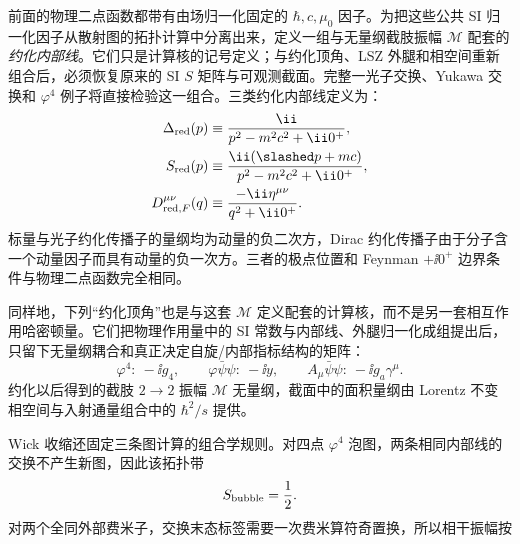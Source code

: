 前面的物理二点函数都带有由场归一化固定的 $\hbar,c,\mu_0$ 因子。为把这些公共 SI 归一化因子从散射图的拓扑计算中分离出来，定义一组与无量纲截肢振幅 $\mathcal M$ 配套的\emph{约化内部线}。它们只是计算核的记号定义；与约化顶角、LSZ 外腿和相空间重新组合后，必须恢复原来的 SI $S$ 矩阵与可观测截面。完整一光子交换、Yukawa 交换和 $\varphi^4$ 例子将直接检验这一组合。三类约化内部线定义为：
\begin{align}
 \Delta_{\rm red}(p)
 &\equiv\frac{\ii}{p^2-m^2c^2+\ii0^+},\\
 S_{\rm red}(p)
 &\equiv\frac{\ii(\slashed p+mc)}
 {p^2-m^2c^2+\ii0^+},
 \\
 D_{{\rm red},F}^{\mu\nu}(q)
 &\equiv\frac{-\ii\eta^{\mu\nu}}
 {q^2+\ii0^+}.
 \label{eq:si-reduced-propagators-r10}
\end{align}
标量与光子约化传播子的量纲均为动量的负二次方，Dirac 约化传播子由于分子含一个动量因子而具有动量的负一次方。三者的极点位置和 Feynman $+\ii0^+$ 边界条件与物理二点函数完全相同。

同样地，下列“约化顶角”也是与这套 $\mathcal M$ 定义配套的计算核，而不是另一套相互作用哈密顿量。它们把物理作用量中的 SI 常数与内部线、外腿归一化成组提出后，只留下无量纲耦合和真正决定自旋/内部指标结构的矩阵：
\begin{equation}
 {
 \varphi^4:\ -\ii g_4,
 \qquad
 \varphi\bar\psi\psi:\ -\ii y,
 \qquad
 A_\mu\bar\psi\psi:\ -\ii g_a\gamma^\mu.}
 \label{eq:si-reduced-vertices-r10}
\end{equation}
约化以后得到的截肢 $2\to2$ 振幅 $\mathcal M$ 无量纲，截面中的面积量纲由 Lorentz 不变相空间与入射通量组合中的 $\hbar^2/s$ 提供。

Wick 收缩还固定三条图计算的组合学规则。对四点 $\varphi^4$ 泡图，两条相同内部线的交换不产生新图，因此该拓扑带
\begin{equation}
 S_{\rm bubble}=\frac12.
 \label{eq:phi4-bubble-symmetry-factor-dp68}
\end{equation}
对两个全同外部费米子，交换末态标签需要一次费米算符奇置换，所以相干振幅按


